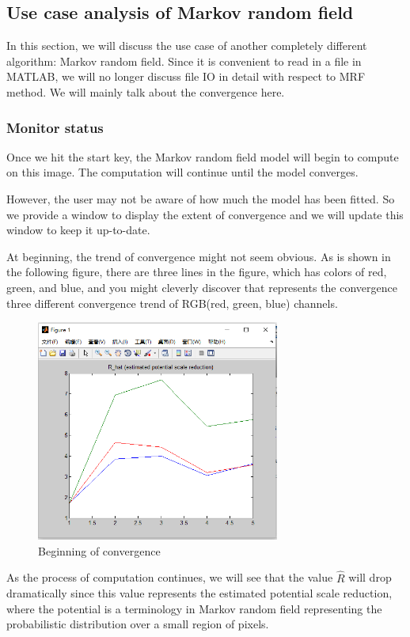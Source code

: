 \subsection{Use case analysis of Markov random field}
In this section, we will discuss the use case of another completely different algorithm: Markov random field. Since it is convenient to read in a file in MATLAB, we will no longer discuss file IO in detail with respect to MRF method. We will mainly talk about the convergence here.
\subsubsection{Monitor status}
Once we hit the start key, the Markov random field model will begin to compute on this image. The computation will continue until the model converges.

However, the user may not be aware of how much the model has been fitted. So we provide a window to display the extent of convergence and we will update this window to keep it up-to-date.

At beginning, the trend of convergence might not seem obvious. As is shown in the following figure, there are three lines in the figure, which has colors of red, green, and blue, and you might cleverly discover that represents the convergence three different convergence trend of RGB(red, green, blue) channels.

\begin{figure}[H]
\centering
\includegraphics[width=8cm]{mrf_beg.png}
\caption{Beginning of convergence}
\end{figure}

As the process of computation continues, we will see that the value $\hat{R}$ will drop dramatically since this value represents the estimated potential scale reduction, where the potential is a terminology in Markov random field representing the probabilistic distribution over a small region of pixels.

